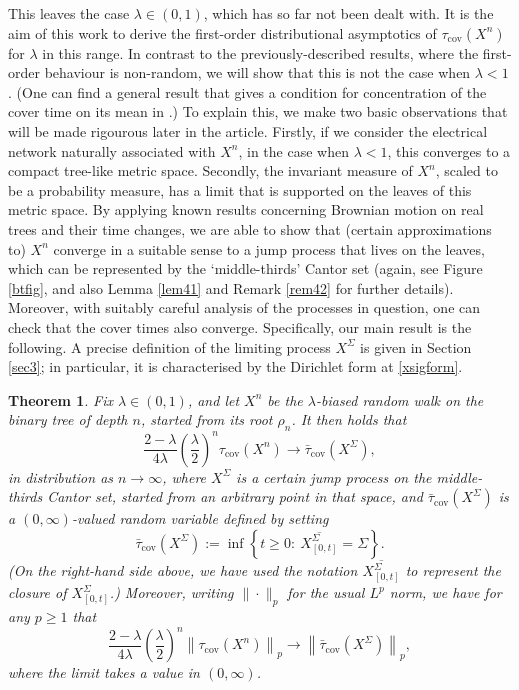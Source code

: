 \documentclass[a4paper, 11pt]{article}
\newtheorem{theorem}{Theorem}[section]
\begin{document}
This leaves the case $\lambda\in (0,1)$, which has so far not been dealt with. It is the aim of this work to derive the first-order distributional asymptotics of $\tau_{\mathrm{cov}}(X^n)$ for $\lambda$ in this range. In contrast to the previously-described results, where the first-order behaviour is non-random, we will show that this is not the case when $\lambda<1$. (One can find a general result that gives a condition for concentration of the cover time on its mean in \cite{Aldcov}.) To explain this, we make two basic observations that will be made rigourous later in the article. Firstly, if we consider the electrical network naturally associated with $X^n$, in the case when $\lambda<1$, this converges to a compact tree-like metric space. Secondly, the invariant measure of $X^n$, scaled to be a probability measure, has a limit that is supported on the leaves of this metric space. By applying known results concerning Brownian motion on real trees and their time changes, we are able to show that (certain approximations to) $X^n$ converge in a suitable sense to a jump process that lives on the leaves, which can be represented by the `middle-thirds' Cantor set (again, see Figure \ref{btfig}, and also Lemma \ref{lem41} and Remark \ref{rem42} for further details). Moreover, with suitably careful analysis of the processes in question, one can check that the cover times also converge. Specifically, our main result is the following. A precise definition of the limiting process $X^\Sigma$ is given in Section \ref{sec3}; in particular, it is characterised by the Dirichlet form at \eqref{xsigform}.

\begin{theorem}\label{main}
Fix $\lambda\in(0,1)$, and let $X^n$ be the $\lambda$-biased random walk on the binary tree of depth $n$, started from its root $\rho_n$. It then holds that
\[\frac{2-\lambda}{4\lambda}\left(\frac{\lambda}{2}\right)^n\tau_{\mathrm{cov}}(X^n)\rightarrow \bar{\tau}_{\mathrm{cov}}(X^\Sigma),\]
in distribution as $n\rightarrow \infty$, where $X^\Sigma$ is a certain jump process on the middle-thirds Cantor set, started from an arbitrary point in that space, and $\bar{\tau}_{\mathrm{cov}}(X^\Sigma)$ is a $(0,\infty)$-valued random variable defined by setting
\begin{equation}\label{otau}
\bar{\tau}_{\mathrm{cov}}(X^\Sigma):=\inf\left\{t\geq 0:\:\overline{X^\Sigma_{[0,t]}}=\Sigma\right\}.
\end{equation}
(On the right-hand side above, we have used the notation $\overline{X^\Sigma_{[0,t]}}$ to represent the closure of ${X^\Sigma_{[0,t]}}$.) Moreover, writing $\|\cdot\|_p$ for the usual $L^p$ norm, we have for any $p\geq 1$ that
\[\frac{2-\lambda}{4\lambda}\left(\frac{\lambda}{2}\right)^n\left\|\tau_{\mathrm{cov}}(X^n)\right\|_{p}\rightarrow \left\|\bar{\tau}_{\mathrm{cov}}(X^\Sigma)\right\|_p,\]
where the limit takes a value in $(0,\infty)$.
\end{theorem}
\end{document}
